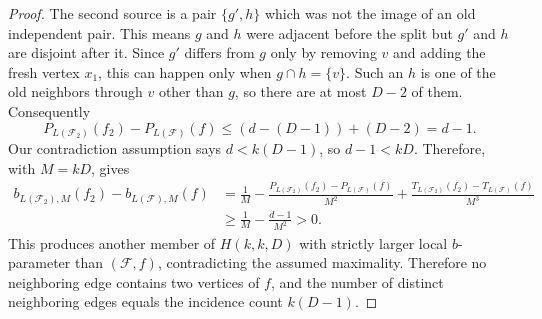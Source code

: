 \begin{proof}
The second source is a pair $\{g',h\}$ which was not the image of an old
independent pair.  This means $g$ and $h$ were adjacent before the split but
$g'$ and $h$ are disjoint after it.  Since $g'$ differs from $g$ only by
removing $v$ and adding the fresh vertex $x_1$, this can happen only when
$g\cap h=\{v\}$.  Such an $h$ is one of the old neighbors through $v$ other
than $g$, so there are at most $D-2$ of them.  Consequently
\[
  P_{L(\mathcal F_2)}(f_2)-P_{L(\mathcal F)}(f)
  \le (d-(D-1))+(D-2)=d-1.
\]
Our contradiction assumption says $d<k(D-1)$, so $d-1<kD$.  Therefore, with
$M=kD$,  gives
\[
\begin{aligned}
b_{L(\mathcal F_2),M}(f_2)-b_{L(\mathcal F),M}(f)
&=\frac{1}{M}
  -\frac{P_{L(\mathcal F_2)}(f_2)-P_{L(\mathcal F)}(f)}{M^2}
  +\frac{T_{L(\mathcal F_2)}(f_2)-T_{L(\mathcal F)}(f)}{M^3}  \\
&\ge \frac{1}{M}-\frac{d-1}{M^2}
>0 .
\end{aligned}
\]
This produces another member of $H(k,k,D)$ with strictly larger local
$b$-parameter than $(\mathcal F,f)$, contradicting the assumed maximality.
Therefore no neighboring edge contains two vertices of $f$, and the number
of distinct neighboring edges equals the incidence count $k(D-1)$.
\end{proof}
